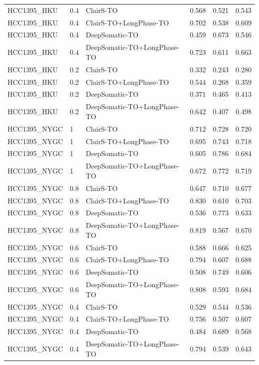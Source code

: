 \documentclass[pdflatex,sn-nature]{sn-jnl}
\begin{document}
{\begin{longtable}{@{}lllccc@{}}
  HCC1395\_HKU & 0.4 & ClairS-TO & 0.568 & 0.521 & 0.543 \\
  HCC1395\_HKU & 0.4 & ClairS-TO+LongPhase-TO & 0.702 & 0.538 & 0.609 \\
  HCC1395\_HKU & 0.4 & DeepSomatic-TO & 0.459 & 0.673 & 0.546 \\
  HCC1395\_HKU & 0.4 & DeepSomatic-TO+LongPhase-TO & 0.723 & 0.611 & 0.663 \\
  HCC1395\_HKU & 0.2 & ClairS-TO & 0.332 & 0.243 & 0.280 \\
  HCC1395\_HKU & 0.2 & ClairS-TO+LongPhase-TO & 0.544 & 0.268 & 0.359 \\
  HCC1395\_HKU & 0.2 & DeepSomatic-TO & 0.371 & 0.465 & 0.413 \\
  HCC1395\_HKU & 0.2 & DeepSomatic-TO+LongPhase-TO & 0.642 & 0.407 & 0.498 \\
  HCC1395\_NYGC & 1 & ClairS-TO & 0.712 & 0.728 & 0.720 \\
  HCC1395\_NYGC & 1 & ClairS-TO+LongPhase-TO & 0.695 & 0.743 & 0.718 \\
  HCC1395\_NYGC & 1 & DeepSomatic-TO & 0.605 & 0.786 & 0.684 \\
  HCC1395\_NYGC & 1 & DeepSomatic-TO+LongPhase-TO & 0.672 & 0.772 & 0.719 \\
  HCC1395\_NYGC & 0.8 & ClairS-TO & 0.647 & 0.710 & 0.677 \\
  HCC1395\_NYGC & 0.8 & ClairS-TO+LongPhase-TO & 0.830 & 0.610 & 0.703 \\
  HCC1395\_NYGC & 0.8 & DeepSomatic-TO & 0.536 & 0.773 & 0.633 \\
  HCC1395\_NYGC & 0.8 & DeepSomatic-TO+LongPhase-TO & 0.819 & 0.567 & 0.670 \\
  HCC1395\_NYGC & 0.6 & ClairS-TO & 0.588 & 0.666 & 0.625 \\
  HCC1395\_NYGC & 0.6 & ClairS-TO+LongPhase-TO & 0.794 & 0.607 & 0.688 \\
  HCC1395\_NYGC & 0.6 & DeepSomatic-TO & 0.508 & 0.749 & 0.606 \\
  HCC1395\_NYGC & 0.6 & DeepSomatic-TO+LongPhase-TO & 0.808 & 0.593 & 0.684 \\
  HCC1395\_NYGC & 0.4 & ClairS-TO & 0.529 & 0.544 & 0.536 \\
  HCC1395\_NYGC & 0.4 & ClairS-TO+LongPhase-TO & 0.756 & 0.507 & 0.607 \\
  HCC1395\_NYGC & 0.4 & DeepSomatic-TO & 0.484 & 0.689 & 0.568 \\
  HCC1395\_NYGC & 0.4 & DeepSomatic-TO+LongPhase-TO & 0.794 & 0.539 & 0.643 \\

\end{longtable}}
\end{document}
